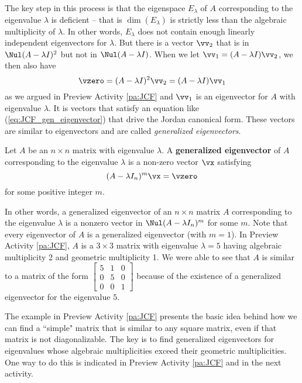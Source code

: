 The key step in this process is that the eigenspace $E_{\lambda}$ of $A$ corresponding to the eigenvalue $\lambda$ is deficient -- that is $\dim(E_{\lambda})$ is strictly less than the algebraic multiplicity of $\lambda$. In other words, $E_{\lambda}$ does not contain enough linearly independent eigenvectors for $\lambda$. But there is a vector $\vv_2$ that is in $\Nul (A - \lambda I)^2$ but not in $\Nul (A - \lambda I)$. When we let $\vv_1 = (A-\lambda I) \vv_2$, we then also have 
\begin{equation} \label{eq:JCF_gen_eigenvector}
\vzero = (A-\lambda I)^2\vv_2 = (A-\lambda I)\vv_1
\end{equation}
as we argued in Preview Activity \ref{pa:JCF} and $\vv_1$ is an eigenvector for $A$ with eigenvalue $\lambda$. It is vectors that satisfy an equation like (\ref{eq:JCF_gen_eigenvector}) that drive the Jordan canonical form. These vectors are similar to eigenvectors and are called \emph{generalized eigenvectors}.

\begin{definition} Let $A$ be an $n \times n$ matrix with eigenvalue $\lambda$. A \textbf{generalized eigenvector} of $A$ corresponding to the eigenvalue $\lambda$ is a non-zero vector $\vx$ satisfying 
\[(A - \lambda I_n)^m \vx = \vzero\]
for some positive integer $m$. 
\end{definition}

In other words, a generalized eigenvector of an $n \times n$ matrix $A$ corresponding to the eigenvalue $\lambda$ is a nonzero vector in $\Nul (A - \lambda I_n)^m$ for some $m$. Note that every eigenvector of $A$ is a generalized eigenvector (with $m=1$). In Preview Activity \ref{pa:JCF}, $A$ is a $3 \times 3$ matrix with eigenvalue $\lambda = 5$ having algebraic multiplicity 2 and geometric multiplicity 1. We were able to see that $A$ is similar to a matrix of the form $\left[ \begin{array}{ccc} 5 &1&0 \\ 0 & 5 &0 \\ 0&0&1\end{array} \right]$ because of the existence of a generalized eigenvector for the eigenvalue $5$. 

The example in Preview Activity \ref{pa:JCF} presents the basic idea behind how we can find a ``simple" matrix that is similar to any square matrix, even if that matrix is not diagonalizable. The key is to find generalized eigenvectors for eigenvalues whose algebraic multiplicities exceed their geometric multiplicities. One way to do this is indicated in Preview Activity \ref{pa:JCF} and in the next activity.


